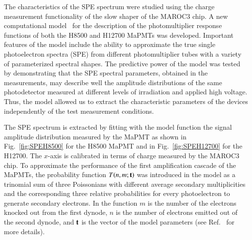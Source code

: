 \documentclass[5p,times,twocolumn]{elsarticle}
\begin{document}
The characteristics of the SPE spectrum were studied using the charge measurement functionality of the slow shaper
of the MAROC3 chip. A new computational model~\cite{Pavel} for the description of the photomultiplier response
functions of both the H8500 and H12700 MaPMTs was developed. Important features of the model include the ability
to approximate the true single photoelectron spectra (SPE) from different photomultiplier tubes with a variety of
parameterized spectral shapes.
The predictive power of the model was tested by demonstrating that the SPE spectral parameters, obtained in the
measurements, may describe well the amplitude distributions of the same photodetector measured at different levels
of irradiation and applied high voltage. Thus, the model allowed us to extract the characteristic parameters of the
devices independently of the test measurement conditions.

The SPE spectrum is extracted by fitting with the model function the signal amplitude distribution measured by the
MaPMT as shown in Fig.~\ref{fig:SPEH8500} for the H8500 MaPMT and in Fig.~\ref{fig:SPEH12700} for the H12700.
The $x$-axis is calibrated in terms of charge measured by the MAROC3 chip.
To approximate the performance of the first amplification cascade of the MaPMTs, the probability function
$T(n,m;{\bf t})$ was introduced in the model as a trinomial sum of three Poissonians with different average secondary
multiplicities and the corresponding three relative probabilities for every photoelectron to generate secondary
electrons. In the function $m$ is the number of the electrons knocked out from the first dynode, $n$ is the number
of electrons emitted out of the second dynode, and ${\bf t}$ is the vector of the model parameters
(see Ref.~\cite{Pavel} for more details).
 
\end{document}
